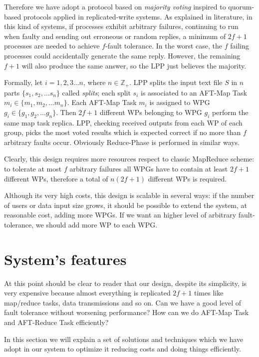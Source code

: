 \documentclass[sigchi]{acmart}
\begin{document}
Therefore we have adopt a protocol based on \textit{majority voting} inspired to quorum-based protocols applied in replicated-write systems. As explained in literature\citep{SDCC}, in this kind of systems, if processes exhibit arbitrary failures, continuing to run when faulty and sending out erroneous or random replies, a minimum of $2f+1$ processes are needed to achieve $f$-fault tolerance. In the worst case, the $f$ failing processes could accidentally generate the same reply. However, the remaining $f+1$ will also produce the same answer, so the LPP just believes the majority.

Formally, let $i = 1,2,3...n$, where $n \in \mathbb{Z}_+$. LPP splits the input text file $S$ in $n$ parts $\lbrace s_1, s_2, ... s_n \rbrace$ called \textit{splits}; each split $s_i$ is associated to an AFT-Map Task $m_i \in \lbrace m_1, m_2, ... m_n \rbrace$. Each AFT-Map Task $m_i$ is assigned to WPG $g_i \in \lbrace g_1, g_2, ... g_n \rbrace$. Then $2f+1$ different WPs belonging to WPG $g_i$ perform the same map task replica. LPP, checking received outputs from each WP of each group, picks the most voted results which is expected correct if no more than $f$ arbitrary faults occur. Obviously Reduce-Phase is performed in similar ways.

Clearly, this design requires more resources respect to classic MapReduce scheme: to tolerate at most $f$ arbitrary failures all WPGs have to contain at least $2f+1$ different WPs, therefore a total of $n(2f+1)$ different WPs is required. 

Although its very high costs, this design is scalable in several ways: if the number of users or data input size grows, it should be possible to extend the system, at reasonable cost, adding more WPGs. If we want an higher level of arbitrary fault-tolerance, we should add more WP to each WPG.

\section{System's features}

At this point should be clear to reader that our design, despite its simplicity, is very expensive because almost everything is replicated $2f + 1$ times like map/reduce tasks, data transmissions and so on. Can we have a good level of fault tolerance without worsening performance? How can we do AFT-Map Task and AFT-Reduce Task efficiently? 

In this section we will explain a set of solutions and techniques which we have adopt in our system to optimize it reducing costs and doing things efficiently.
\end{document}
